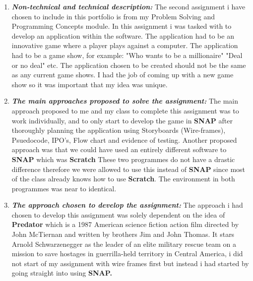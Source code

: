 \documentclass[12pt]{article}
\begin{document}
\begin{enumerate}
\item \textbf{\emph{Non-technical and technical description: }} The second assignment i have chosen to include in this portfolio is from my Problem Solving and Programming Concepts
module. In this assignment i was tasked with to develop an application within the \cite{noauthor_snap!_nodate} software. The application had to be an innovative game where a player plays against a computer. The application had to be a game show, for example: "Who wants to be a millionaire" "Deal or no deal" etc. The application chosen to be created should not be the same as any current game shows. I had the job of coming up with a new game show so it was important that my idea was unique.



\item \textbf{\emph{The main approaches proposed to solve the assignment: }} The main approach proposed to me and my class to complete this assignment was to work individually, and to only start to develop the game in \textbf{SNAP} after thoroughly planning the application using Storyboards (Wire-frames), Psuedocode, IPO's, Flow chart and evidence of testing.
Another proposed approach was that we could have used an entirely different software to \textbf{SNAP} which was \textbf{Scratch}
These two programmes do not have a drastic difference therefore we were allowed to use this instead of \textbf{SNAP} since most of the class already knows how to use \textbf{Scratch}. The environment in both programmes was near to identical.



\item \textbf{\emph{The approach chosen to develop the assignment: }} The approach i had chosen to develop this assignment was solely dependent on the idea of \textbf{Predator} which is a 1987 American science fiction action film directed by John McTiernan and written by brothers Jim and John Thomas. It stars Arnold Schwarzenegger as the leader of an elite military rescue team on a mission to save hostages in guerrilla-held territory in Central America, i did not start of my assignment with wire frames first but instead i had started by going straight into using \textbf{SNAP.}


\end{enumerate}
\end{document}
